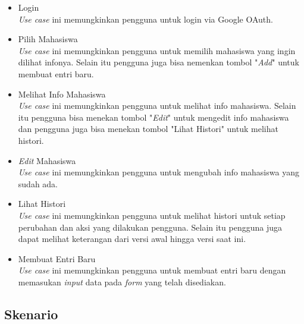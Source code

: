 \begin{itemize}
\item Login\\
{\it Use case} ini memungkinkan pengguna untuk login via Google OAuth.
\item Pilih Mahasiswa\\
{\it Use case} ini memungkinkan pengguna untuk memilih mahasiswa yang ingin dilihat
infonya. Selain itu pengguna juga bisa nemenkan tombol "{\it Add}" untuk
membuat entri baru.
\item Melihat Info Mahasiswa\\
{\it Use case} ini memungkinkan pengguna untuk melihat info mahasiswa. Selain itu
pengguna bisa menekan tombol "{\it Edit}" untuk mengedit info mahasiswa dan
pengguna juga bisa menekan tombol "Lihat Histori" untuk melihat histori.
\item {\it Edit} Mahasiswa\\
{\it Use case} ini memungkinkan pengguna untuk mengubah info mahasiswa yang
sudah ada.
\item Lihat Histori\\
{\it Use case} ini memungkinkan pengguna untuk melihat histori untuk setiap perubahan
dan aksi yang dilakukan pengguna. Selain itu pengguna juga dapat melihat keterangan dari versi awal hingga versi saat ini.
\item Membuat Entri Baru\\
{\it Use case} ini memungkinkan pengguna untuk membuat entri baru dengan memasukan 
{\it input} data pada {\it form} yang telah disediakan.
\end{itemize}

\subsection{Skenario}

